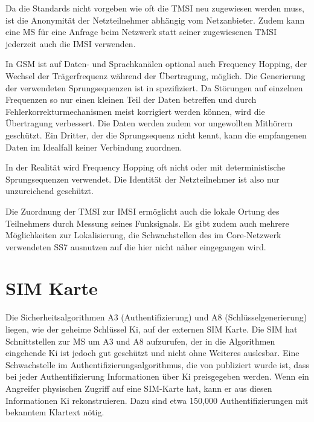 Da die Standards nicht vorgeben wie oft die \ac{TMSI} neu zugewiesen werden muss, ist die Anonymität der Netzteilnehmer abhängig vom Netzanbieter. Zudem kann eine \ac{MS} für eine Anfrage beim Netzwerk statt seiner zugewiesenen \ac{TMSI} jederzeit auch die \ac{IMSI} verwenden. 

In \ac{GSM} ist auf Daten- und Sprachkanälen optional auch Frequency Hopping, der Wechsel der Trägerfrequenz während der Übertragung, möglich. Die Generierung der verwendeten Sprungsequenzen ist in  spezifiziert. Da Störungen auf einzelnen Frequenzen so nur einen kleinen Teil der Daten betreffen und durch Fehlerkorrekturmechanismen meist korrigiert werden können, wird die Übertragung verbessert.  Die Daten werden zudem vor ungewollten Mithörern geschützt. Ein Dritter, der die Sprungsequenz nicht kennt, kann die empfangenen Daten im Idealfall keiner Verbindung zuordnen. 

In der Realität wird Frequency Hopping oft nicht oder mit deterministische Sprungsequenzen verwendet. Die Identität der Netzteilnehmer ist also nur unzureichend geschützt. 

Die Zuordnung der \ac{TMSI} zur \ac{IMSI} ermöglicht auch die lokale Ortung des Teilnehmers durch Messung seines Funksignals. Es gibt zudem auch mehrere Möglichkeiten zur Lokalisierung, die Schwachstellen des im Core-Netzwerk verwendeten \ac{SS7} ausnutzen \citep{Mourad:fall-of-ss7} auf die hier nicht näher eingegangen wird. 

\section{SIM Karte}

Die Sicherheitsalgorithmen \ac{A3} (Authentifizierung) und \ac{A8} (Schlüsselgenerierung) liegen, wie der geheime Schlüssel \acs{Ki}, auf der externen \ac{SIM} Karte. Die \ac{SIM} hat Schnittstellen zur \ac{MS} um \ac{A3} und \ac{A8} aufzurufen, der in die Algorithmen eingehende \ac{Ki} ist jedoch gut geschützt und nicht ohne Weiteres auslesbar. Eine Schwachstelle im Authentifizierungsalgorithmus, die von \citet{handschuh1998reducing} publiziert wurde ist, dass bei jeder Authentifizierung Informationen über \ac{Ki} preisgegeben werden. Wenn ein Angreifer physischen Zugriff auf eine \ac{SIM}-Karte hat, kann er aus diesen Informationen \ac{Ki} rekonstruieren. Dazu sind etwa 150,000 Authentifizierungen mit bekanntem Klartext nötig. 

